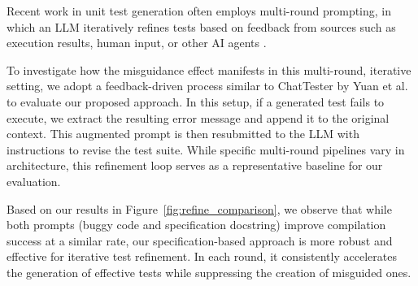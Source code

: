 \documentclass[acmsmall]{acmart}
\begin{document}




Recent work in unit test generation often employs multi-round prompting, in which an LLM iteratively refines tests based on feedback from sources such as execution results, human input, or other AI agents \cite{ChatUniTestFSE2024Demo, EvalImprChatgptUTGenFSE2024, testforge_multi_round}.

To investigate how the misguidance effect manifests in this multi-round, iterative setting, we adopt a feedback-driven process similar to ChatTester by Yuan et al.~\cite{EvalImprChatgptUTGenFSE2024} to evaluate our proposed approach. In this setup, if a generated test fails to execute, we extract the resulting error message and append it to the original context. This augmented prompt is then resubmitted to the LLM with instructions to revise the test suite. While specific multi-round pipelines vary in architecture, this refinement loop serves as a representative baseline for our evaluation.

Based on our results in Figure~\ref{fig:refine_comparison}, we observe that while both prompts (buggy code and specification docstring) improve compilation success at a similar rate, our specification-based approach is more robust and effective for iterative test refinement. In each round, it consistently accelerates the generation of effective tests while suppressing the creation of misguided ones.
\end{document}
